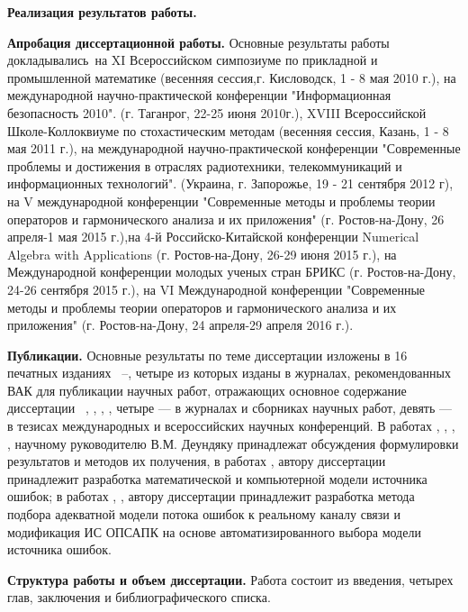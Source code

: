 \documentclass[twoside,12pt]{article}
\begin{document}
\textbf{Реализация результатов работы. }

\textbf{Апробация диссертационной работы.}
Основные результаты работы докладывались~на XI Всероссийском симпозиуме по прикладной и промышленной математике (весенняя сессия,г. Кисловодск, 1 - 8 мая 2010 г.), на международной научно-практической конференции "Информационная безопасность 2010". (г. Таганрог, 22-25 июня 2010г.), XVIII Всероссийской Школе-Коллоквиуме по стохастическим методам (весенняя сессия, Казань, 1 - 8 мая 2011 г.), на международной научно-практической конференции "Современные проблемы и достижения в отраслях радиотехники, телекоммуникаций и информационных технологий". (Украина, г. Запорожье, 19 - 21 сентября 2012 г), на V международной конференции "Современные методы и проблемы теории операторов и гармонического анализа и их приложения" (г. Ростов-на-Дону, 26 апреля-1 мая 2015 г.),на 4-й Российско-Китайской конференции Numerical Algebra with Applications (г. Ростов-на-Дону, 26-29 июня 2015 г.), на Международной конференции молодых ученых стран БРИКС (г. Ростов-на-Дону, 24-26 сентября 2015 г.), на VI Международной конференции "Современные методы и проблемы теории операторов и гармонического анализа и их приложения" (г. Ростов-на-Дону, 24 апреля-29 апреля 2016 г.).

\textbf{Публикации.} Основные результаты по теме диссертации изложены в 16 печатных изданиях ~\cite{BibZhd_2009}--\cite{DeMoZhd_DSTU}, четыре из которых изданы в журналах, рекомендованных ВАК для публикации научных работ, отражающих основное содержание диссертации ~\cite{DeZhda_VGU13}, \cite{DeZhd_DSTU14}, \cite{DeZhda_Izvestia2015}, \cite{DeMoZhd_DSTU}, четыре --- в журналах и сборниках научных работ,
девять --- в тезисах международных и всероссийских научных конференций. В работах \cite{DeZhda_Ivan}, \cite{DeZhda_Obozr11}, \cite{DeZhda_Obozr10}, \cite{DeZhda_VGU13}, \cite{DeZhd_DSTU14} научному руководителю В.М. Деундяку принадлежат обсуждения формулировки результатов и методов их получения, в работах \cite{BibZhd_2009}, \cite{BibZhd_2010} автору диссертации принадлежит разработка математической и компьютерной модели источника ошибок; в работах \cite{DeMoZhd_Sim}, \cite{DeMoZhd_conf16}, \cite{DeMoZhd_DSTU} автору диссертации принадлежит разработка метода подбора адекватной модели потока ошибок к реальному каналу связи и модификация ИС ОПСАПК на основе автоматизированного выбора модели источника ошибок.

\textbf{Структура работы и объем диссертации.}
Работа состоит из введения, четырех глав, заключения и библиографического списка.
\end{document}
